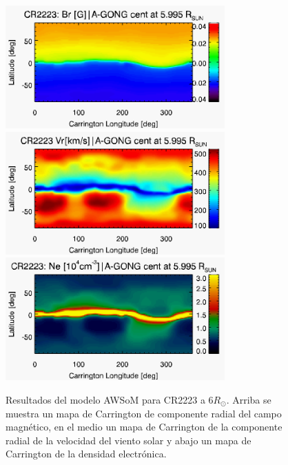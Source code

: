 \documentclass[a4paper,11pt]{report}
\begin{document}
\begin{figure}%
\begin{center}
\includegraphics[width=0.75\textwidth]{figuras/map_Br_awsom_2223_cocent_extended_5_995_Rsun.png}
\includegraphics[width=0.75\textwidth]{figuras/map_Vr_awsom_2223_cocent_extended_5_995_Rsun.png}
\includegraphics[width=0.75\textwidth]{figuras/map_Ne_awsom_2223_cocent_extended_5_995_Rsun.png}
\end{center}
\caption{Resultados del modelo AWSoM para CR2223 a $6 R_{\odot}$. Arriba se muestra un mapa de Carrington de componente radial del campo magnético, en el medio un mapa de Carrington de la componente radial de la velocidad del viento solar y abajo un mapa de Carrington de la densidad electrónica.}
\label{resultados1}
\end{figure}
\end{document}
